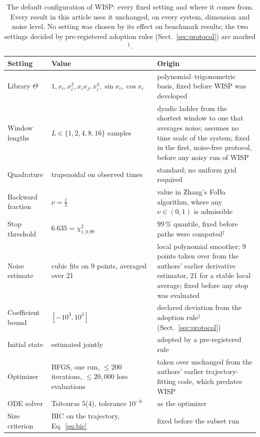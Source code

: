 \documentclass[10pt]{article}
\begin{document}
\begin{table}[t]
\centering\small
\caption{The default configuration of WISP: every fixed setting and where it comes from. Every result in this article
uses it unchanged, on every system, dimension and noise level. No setting was chosen by its effect on benchmark
results; the two settings decided by pre-registered adoption rules (Sect.~\ref{sec:protocol}) are marked $^\ddagger$.}
\label{tab:settings}
\setlength{\tabcolsep}{4pt}
\begin{tabularx}{\textwidth}{@{}lp{40mm}X@{}}
\toprule
Setting & Value & Origin \\
\midrule
Library $\Theta$ & $1,x_i,x_i^2,x_ix_j,x_i^3,\sin x_i,\cos x_i$ & polynomial--trigonometric basis, fixed before WISP was developed \\
Window lengths & $L\in\{1,2,4,8,16\}$ samples & dyadic ladder from the shortest window to one that averages noise;
assumes no time scale of the system; fixed in the first, noise-free protocol, before any noisy run of WISP \\
Quadrature & trapezoidal on observed times & standard; no uniform grid required \\
Backward fraction & $\nu=\tfrac12$ & value in Zhang's FoBa algorithm, where any $\nu\in(0,1)$ is admissible \cite{zhang2011} \\
Stop threshold & $6.635=\chi^2_{1,0.99}$ & 99\,\% quantile, fixed before paths were computed$^\ddagger$ \\
Noise estimate & cubic fits on 9 points, averaged over 21 & local polynomial smoother; 9 points taken over from the
authors' earlier derivative estimator, 21 for a stable local average; fixed before any stop was evaluated \\
Coefficient bound & $[-10^3,10^3]$ & declared deviation from the adoption rule$^\ddagger$ (Sect.~\ref{sec:protocol}) \\
Initial state & estimated jointly & adopted by a pre-registered rule \\
Optimizer & BFGS, one run, $\le200$ iterations, $\le20{,}000$ loss evaluations & taken over unchanged from the
authors' earlier trajectory-fitting code, which predates WISP \\
ODE solver & Tsitouras 5(4), tolerance $10^{-6}$ & as the optimizer \\
Size criterion & BIC on the trajectory, Eq.~\eqref{eq:bic} & fixed before the subset run \\
\bottomrule
\end{tabularx}
\end{table}
\end{document}
